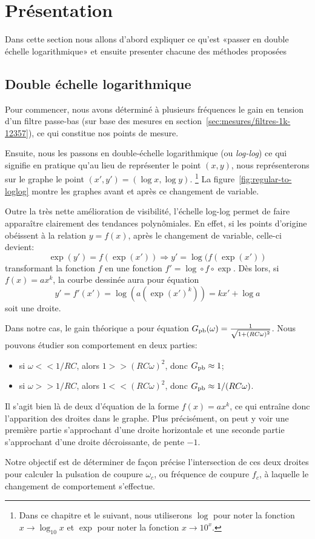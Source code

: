 \section{Présentation}
\label{sec:approx-lin/pres}

Dans cette section nous allons d'abord expliquer ce qu'est
«passer en double échelle logarithmique» et ensuite presenter
chacune des méthodes proposées

\subsection{Double échelle logarithmique}
Pour commencer, nous avons déterminé à plusieurs fréquences
le gain en tension d'un filtre passe-bas
(sur base des mesures en section~\ref{sec:mesures/filtres-1k-12357}),
ce qui constitue nos points de mesure.

Ensuite, nous les passons en double-échelle logarithmique (ou \emph{log-log})
ce qui signifie en pratique qu'au lieu de représenter le point $(x,y)$,
nous représenterons sur le graphe le point $(x',y') = (\log x,\log y)$.%
\footnote{
    Dans ce chapitre et le suivant, nous utiliserons
    $\log$ pour noter la fonction $x \to \log_{10} x$
    et $\exp$ pour noter la fonction $x \to 10^x$.
}
La figure~\ref{fig:regular-to-loglog} montre les graphes
avant et après ce changement de variable.

Outre la très nette amélioration de visibilité,
l'échelle log-log permet de faire apparaître clairement
des tendances polynômiales.
En effet, si les points d'origine obéissent à la relation $y = f(x)$,
après le changement de variable, celle-ci devient:
\begin{equation}
    \exp(y') = f(\exp(x')) \Longrightarrow y' = \log(f(\exp(x'))
\end{equation}
transformant la fonction $f$ en une fonction $f' = \log\circ f\circ\exp$.
Dès lors, si $f(x) = ax^k$, la courbe dessinée aura pour
équation
\begin{equation}
    y' = f'(x') = \log(a(\exp(x')^k)) = kx'+\log a
\end{equation}
soit une droite.

Dans notre cas, le gain théorique a pour équation
$G_{\mathrm{pb}}(\omega) = \frac{1}{\sqrt{1+(RC\omega)^2}}$.
Nous pouvons étudier son comportement en deux parties:
\begin{itemize}
    \item si $\omega << 1/RC$, alors $1 >> (RC\omega)^2$,
        donc $G_{\mathrm{pb}} \approx 1$;
    \item si $\omega >> 1/RC$, alors $1 << (RC\omega)^2$,
        donc $G_{\mathrm{pb}} \approx 1/(RC\omega)$.
\end{itemize}

Il s'agit bien là de deux d'équation de la forme $f(x) = ax^k$,
ce qui entraîne donc l'apparition des droites dans le graphe.
Plus précisément, on peut y voir
une première partie s'approchant d'une droite horizontale et
une seconde partie s'approchant d'une droite décroissante,
de pente $-1$.

Notre objectif est de déterminer de façon précise
l'intersection de ces deux droites
pour calculer la pulsation de coupure $\omega_c$,
ou fréquence de coupure $f_c$,
à laquelle le changement de comportement s'effectue.
